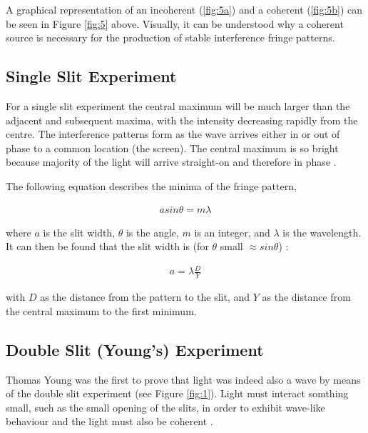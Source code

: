 \documentclass[12pt]{article}
\begin{document}
A graphical representation of an incoherent (\ref{fig:5a}) and a coherent (\ref{fig:5b}) can be seen in Figure \ref{fig:5} above. Visually, it can be understood why a coherent
source is necessary for the production of stable interference fringe patterns.

\subsection{Single Slit Experiment} \label{sec:1.4}

For a single slit experiment the central maximum will be much larger than the adjacent and subsequent maxima, with the intensity decreasing rapidly from the centre. The interference patterns form
as the wave arrives either in or out of phase to a common location (the screen). The central maximum is so bright because majority of the light will arrive straight-on and therefore in phase \cite{urone2012collegesingle}.

The following equation describes the minima of the fringe pattern,

\vspace{-2ex}
\begin{gather}
    a sin \theta = m \lambda
\end{gather}

where $a$ is the slit width, $\theta$ is the angle, $m$ is an integer, and $\lambda$ is the wavelength. It can then be found that the slit width is (for $\theta$ small $\approx sin \theta$) \cite{UCDinterference}:

\vspace{-2ex}
\begin{gather}
    a = \lambda \frac{D}{Y}
\end{gather}

with $D$ as the distance from the pattern to the slit, and $Y$ as the distance from the central maximum to the first minimum.

\subsection{Double Slit (Young's) Experiment} \label{sec:1.5}

Thomas Young was the first to prove that light was indeed also a wave by means of the double slit experiment (see Figure \ref{fig:1}). Light must interact somthing small, such as the small opening of the slits, in order to
exhibit wave-like behaviour and the light must also be coherent \cite{urone2012collegedouble}.
\end{document}
